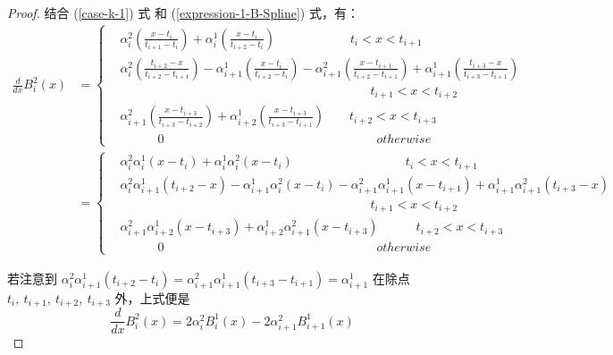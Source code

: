 \documentclass[a4paper]{article}
\begin{document}
\begin{proof}[Proof]
        \noindent 结合 (\ref{case-k-1}) 式 和 (\ref{expression-1-B-Spline}) 式，有：
        \begin{align*}
            \frac{d}{dx} B_i^2(x) & = \left\{\begin{aligned}
                & \alpha_{i}^{2} \left(\frac{x - t_{i}}{t_{i+1} - t_{i}}\right) + \alpha_{i}^{1} \left(\frac{x - t_{i}}{t_{i+2} - t_{i}}\right) \qquad\qquad\qquad t_{i} < x < t_{i+1} \\
                & \alpha_{i}^{2} \left(\frac{t_{i+2} - x}{t_{i+2} - t_{i+1}}\right) - \alpha_{i+1}^{1} \left(\frac{x - t_{i}}{t_{i+2} - t_{i}}\right) - \alpha_{i+1}^{2} \left(\frac{x - t_{i+1}}{t_{i+2} - t_{i+1}}\right) + \alpha_{i+1}^{1} \left(\frac{t_{i+3} - x}{t_{i+3} - t_{i+1}}\right) \\
                & \hspace{240pt} t_{i+1} < x < t_{i+2} \\
                & \alpha_{i+1}^{2} \left(\frac{x - t_{i+3}}{t_{i+3} - t_{i+2}}\right) + \alpha_{i+2}^{1} \left(\frac{x - t_{i+3}}{t_{i+3} - t_{i+1}}\right) \qquad t_{i+2} < x < t_{i+3} \\
                & \quad\qquad 0 \qquad\qquad\qquad\qquad\qquad\qquad\qquad\qquad\quad otherwise
            \end{aligned}\right. \\
            & = \left\{\begin{aligned}
                & \alpha_{i}^{2} \alpha_{i}^{1} (x - t_{i}) + \alpha_{i}^{1} \alpha_{i}^{2} (x - t_{i}) \qquad\qquad\qquad\qquad\quad t_{i} < x < t_{i+1} \\
                & \alpha_{i}^{2} \alpha_{i+1}^{1} (t_{i+2} - x) - \alpha_{i+1}^{1} \alpha_{i}^{2} (x - t_{i}) - \alpha_{i+1}^{2} \alpha_{i+1}^{1} (x - t_{i+1}) + \alpha_{i+1}^{1} \alpha_{i+1}^{2} (t_{i+3} - x) \\
                & \hspace{240pt} t_{i+1} < x < t_{i+2} \\
                & \alpha_{i+1}^{2} \alpha_{i+2}^{1} (x - t_{i+3}) + \alpha_{i+2}^{1} \alpha_{i+1}^{2} (x - t_{i+3}) \qquad\quad t_{i+2} < x < t_{i+3} \\
                & \quad\qquad 0 \qquad\qquad\qquad\qquad\qquad\qquad\qquad\qquad\quad otherwise
            \end{aligned}\right.
        \end{align*}
        
        \noindent 若注意到 $\alpha_{i}^{2} \alpha_{i+1}^{1} (t_{i+2} - t_{i}) = \alpha_{i+1}^{2} \alpha_{i+1}^{1} (t_{i+3} - t_{i+1}) = \alpha_{i+1}^{1}$ 在除点 $t_{i},\ t_{i+1},\ t_{i+2},\ t_{i+3}$ 外，上式便是
        \begin{equation*}
            \frac{d}{dx} B_{i}^{2}(x) = 2 \alpha_{i}^{2} B_{i}^{1}(x) - 2 \alpha_{i+1}^{2} B_{i+1}^{1}(x)
        \end{equation*}


\end{proof}
\end{document}
